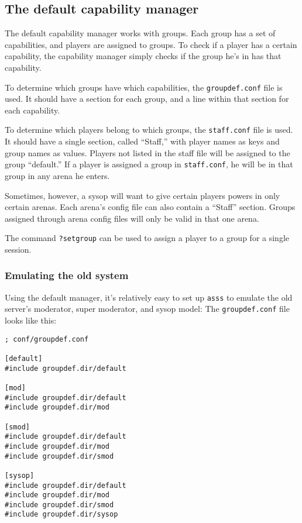 \documentclass{article}
\newcommand{\asss}{\texttt{asss}}
\begin{document}
\subsection{The default capability manager}

The default capability manager works with groups. Each group has a set
of capabilities, and players are assigned to groups. To check if a
player has a certain capability, the capability manager simply checks if
the group he's in has that capability.

To determine which groups have which capabilities, the
\verb/groupdef.conf/ file is used. It should have a section for each
group, and a line within that section for each capability.

To determine which players belong to which groups, the \verb/staff.conf/
file is used. It should have a single section, called ``Staff,'' with
player names as keys and group names as values. Players not listed in
the staff file will be assigned to the group ``default.'' If a player is
assigned a group in \verb/staff.conf/, he will be in that group in any
arena he enters.

Sometimes, however, a sysop will want to give certain players powers in
only certain arenas. Each arena's config file can also contain a
``Staff'' section. Groups assigned through arena config files will only
be valid in that one arena.

The command \verb/?setgroup/ can be used to assign a player to a group
for a single session.

\subsubsection{Emulating the old system}
Using the default manager, it's relatively easy to set up \asss{} to
emulate the old server's moderator, super moderator, and sysop model:
The \verb/groupdef.conf/ file looks like this:

\begin{verbatim}
; conf/groupdef.conf

[default]
#include groupdef.dir/default

[mod]
#include groupdef.dir/default
#include groupdef.dir/mod

[smod]
#include groupdef.dir/default
#include groupdef.dir/mod
#include groupdef.dir/smod

[sysop]
#include groupdef.dir/default
#include groupdef.dir/mod
#include groupdef.dir/smod
#include groupdef.dir/sysop
\end{verbatim}
\end{document}

